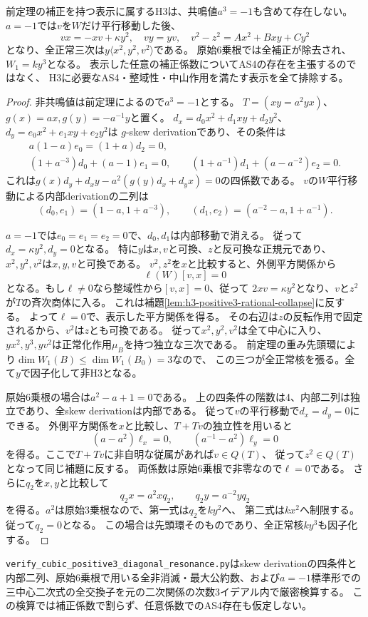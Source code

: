 \begin{theorem}
\label{thm:h3-positive3-diagonal-full-exclusion}
前定理の補正を持つ表示に属するH3は、共鳴値$a^3=-1$も含めて存在しない。
$a=-1$では$v$を$W$だけ平行移動した後、
\[
 vx=-xv+\kappa y^2,\quad vy=yv,\quad
 v^2-z^2=A x^2+Bxy+C y^2
\]
となり、全正常三次は$y\langle x^2,y^2,v^2\rangle$である。
原始6乗根では全補正が除去され、$W_1=ky^3$となる。
表示した任意の補正係数についてAS4の存在を主張するのではなく、
H3に必要なAS4・整域性・中山作用を満たす表示を全て排除する。
\end{theorem}
\begin{proof}
非共鳴値は前定理によるので$a^3=-1$とする。
$T=(xy=a^2yx)$、$g(x)=ax,g(y)=-a^{-1}y$と置く。
$d_x=d_0x^2+d_1xy+d_2y^2$、$d_y=e_0x^2+e_1xy+e_2y^2$は
$g$-skew derivationであり、その条件は
\begin{gather*}
 a(1-a)e_0=(1+a)d_2=0,\\
 (1+a^{-3})d_0+(a-1)e_1=0,\qquad
 (1+a^{-1})d_1+(a-a^{-2})e_2=0.
\end{gather*}
これは$g(x)d_y+d_xy-a^2(g(y)d_x+d_yx)=0$の四係数である。
$v$の$W$平行移動による内部derivationの二列は
\[
 (d_0,e_1)=(1-a,1+a^{-3}),\qquad
 (d_1,e_2)=(a^{-2}-a,1+a^{-1}).
\]

$a=-1$では$e_0=e_1=e_2=0$で、$d_0,d_1$は内部移動で消える。
従って$d_x=\kappa y^2,d_y=0$となる。
特に$y$は$x,v$と可換、$z$と反可換な正規元であり、
$x^2,y^2,v^2$は$x,y,v$と可換である。
$v^2,z^2$を$x$と比較すると、外側平方関係から
\[
 \ell(W)[v,x]=0
\]
となる。もし$\ell\ne0$なら整域性から$[v,x]=0$、従って
$2xv=\kappa y^2$となり、$v$と$z^2$が$T$の斉次商体に入る。
これは補題\ref{lem:h3-positive3-rational-collapse}に反する。
よって$\ell=0$で、表示した平方関係を得る。
その右辺は$z$の反転作用で固定されるから、$v^2$は$z$とも可換である。
従って$x^2,y^2,v^2$は全て中心に入り、
$yx^2,y^3,yv^2$は正常化作用$\mu_B$を持つ独立な三次である。
前定理の重み先頭環により$\dim W_1(B)\le\dim W_1(B_0)=3$なので、
この三つが全正常核を張る。全て$y$で因子化して非H3となる。

原始6乗根の場合は$a^2-a+1=0$である。
上の四条件の階数は4、内部二列は独立であり、全skew derivationは内部である。
従って$v$の平行移動で$d_x=d_y=0$にできる。
外側平方関係を$x$と比較し、$T+Tv$の独立性を用いると
\[
 (a-a^2)\ell_x=0,\qquad(a^{-1}-a^2)\ell_y=0
\]
を得る。ここで$T+Tv$に非自明な従属があれば$v\in Q(T)$、
従って$z^2\in Q(T)$となって同じ補題に反する。
両係数は原始6乗根で非零なので$\ell=0$である。
さらに$q_2$を$x,y$と比較して
\[
 q_2x=a^2xq_2,\qquad q_2y=a^{-2}yq_2
\]
を得る。$a^2$は原始3乗根なので、第一式は$q_2$を$ky^2$へ、
第二式は$kx^2$へ制限する。従って$q_2=0$となる。
この場合は先頭環そのものであり、全正常核$ky^3$も因子化する。
\end{proof}

\texttt{verify\_cubic\_positive3\_diagonal\_resonance.py}はskew derivationの四条件と
内部二列、原始6乗根で用いる全非消滅・最大公約数、および$a=-1$標準形での
三中心二次式の全交換子を元の二次関係の次数3イデアル内で厳密検算する。
この検算では補正係数で割らず、任意係数でのAS4存在も仮定しない。
